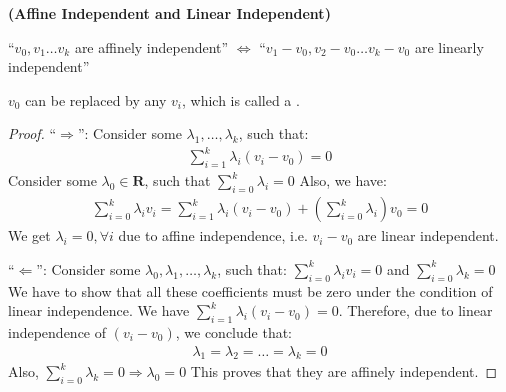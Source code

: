 \documentclass{article}
\newcommand{\bfs}[1]{\textbf{({#1}) }}
\begin{document}
\begin{lema}{\bfs{Affine Independent and Linear Independent}}

\centerline{ ``$v_{0}, v_{1} \ldots v_{k}$ are affinely independent'' $\Longleftrightarrow$ ``$v_{1}-v_{0}, v_{2}-v_{0} \ldots v_{k}-v_{0}$ are linearly independent''}
\end{lema}
\begin{rema}
$v_{0}$ can be replaced by any $v_{i}$, which is called a .
\end{rema}
\begin{proof}\color{ForestGreen}
``$\Rightarrow$'': Consider some $\lambda_{1}, \ldots, \lambda_{k}$, such that:
\begin{align*}
\sum_{i=1}^{k} \lambda_{i}\left(v_{i}-v_{0}\right)=0
\end{align*}
Consider some $\lambda_{0} \in \mathbf{R}$, such that $\sum_{i=0}^{k} \lambda_{i}=0$
Also, we have:
\begin{align*}
\sum_{i=0}^{k} \lambda_{i} v_{i}=\sum_{i=1}^{k} \lambda_{i}\left(v_{i}-v_{0}\right)+\left(\sum_{i=0}^{k} \lambda_{i}\right) v_{0} = 0
\end{align*}
We get $\lambda_{i}=0, \forall i$ due to affine independence, i.e. $v_{i}-v_{0}$ are linear independent.

``$\Leftarrow$'': Consider some $\lambda_{0}, \lambda_{1}, \ldots, \lambda_{k}$, such that: $\sum_{i=0}^{k} \lambda_{i} v_{i}=0$ and $\sum_{i=0}^{k} \lambda_{k}=0$
We have to show that all these coefficients must be zero under the condition of linear independence. We have $\sum_{i=1}^{k} \lambda_{i}\left(v_{i}-v_{0}\right)=0$. Therefore, due to linear independence of $\left(v_{i}-v_{0}\right)$, we conclude that:
\begin{align*}
\lambda_{1}=\lambda_{2}=\ldots=\lambda_{k}=0
\end{align*}
Also, $\sum_{i=0}^{k} \lambda_{k}=0 \Rightarrow \lambda_{0}=0$
This proves that they are affinely independent.
\end{proof}
\end{document}
